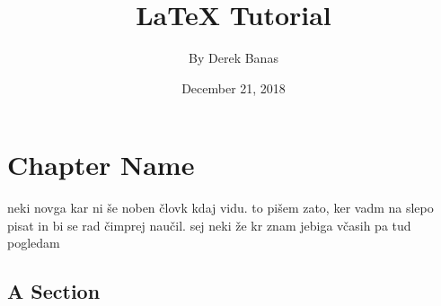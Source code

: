 \documentclass[a4paper,12pt]{book}
\begin{document}
\title{\Large{\textbf{LaTeX Tutorial}}}
\author{By Derek Banas}
\date{December 21, 2018}
 
\maketitle
\let\cleardoublepage\clearpage
 
 
\tableofcontents
 
 
 
 
 
\pagestyle{fancy}
 
\fancyhf{}
 
 
\renewcommand{\headrulewidth}{2pt}
\renewcommand{\footrulewidth}{1pt}
 
 
 
 
\fancyhead[LE]{\leftmark}
 
 
 
\fancyhead[RO]{\nouppercase{\rightmark}}
 
 
\fancyfoot[LE,RO]{\thepage}
 
 
\chapter{Chapter Name}
\blindtext



neki novga kar ni še noben človk kdaj vidu. to pišem zato, ker vadm na slepo pisat in bi se rad čimprej naučil. sej neki že kr znam jebiga včasih pa tud pogledam 
\section{A Section}
 
\end{document}
